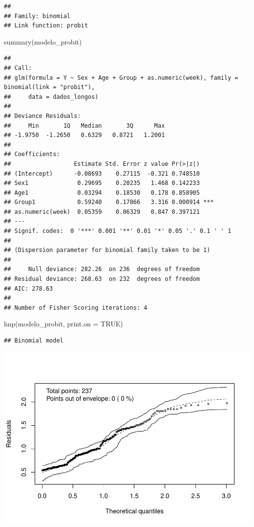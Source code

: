 \documentclass[
]{article}
\newenvironment{Shaded}{\begin{snugshade}}{\end{snugshade}}
\newcommand{\AttributeTok}[1]{\textcolor[rgb]{0.77,0.63,0.00}{#1}}
\newcommand{\ConstantTok}[1]{\textcolor[rgb]{0.00,0.00,0.00}{#1}}
\newcommand{\FunctionTok}[1]{\textcolor[rgb]{0.00,0.00,0.00}{#1}}
\newcommand{\NormalTok}[1]{#1}
\begin{document}
\begin{verbatim}
## 
## Family: binomial 
## Link function: probit
\end{verbatim}

\begin{Shaded}
\begin{Highlighting}[]
\FunctionTok{summary}\NormalTok{(modelo\_probit)}
\end{Highlighting}
\end{Shaded}

\begin{verbatim}
## 
## Call:
## glm(formula = Y ~ Sex + Age + Group + as.numeric(week), family = binomial(link = "probit"), 
##     data = dados_longos)
## 
## Deviance Residuals: 
##     Min       1Q   Median       3Q      Max  
## -1.9750  -1.2650   0.6329   0.8721   1.2001  
## 
## Coefficients:
##                  Estimate Std. Error z value Pr(>|z|)    
## (Intercept)      -0.08693    0.27115  -0.321 0.748510    
## Sex1              0.29695    0.20235   1.468 0.142233    
## Age1              0.03294    0.18530   0.178 0.858905    
## Group1            0.59240    0.17866   3.316 0.000914 ***
## as.numeric(week)  0.05359    0.06329   0.847 0.397121    
## ---
## Signif. codes:  0 '***' 0.001 '**' 0.01 '*' 0.05 '.' 0.1 ' ' 1
## 
## (Dispersion parameter for binomial family taken to be 1)
## 
##     Null deviance: 282.26  on 236  degrees of freedom
## Residual deviance: 268.63  on 232  degrees of freedom
## AIC: 278.63
## 
## Number of Fisher Scoring iterations: 4
\end{verbatim}

\begin{Shaded}
\begin{Highlighting}[]
\FunctionTok{hnp}\NormalTok{(modelo\_probit, }\AttributeTok{print.on =} \ConstantTok{TRUE}\NormalTok{)}
\end{Highlighting}
\end{Shaded}

\begin{verbatim}
## Binomial model
\end{verbatim}

\includegraphics{EDA__files/figure-latex/unnamed-chunk-11-1.pdf}
\end{document}

